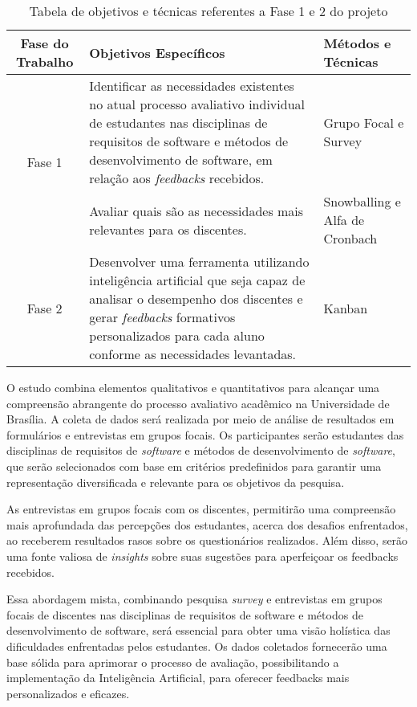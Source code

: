 \begin{table}[!ht]
    \centering
    \begin{tabularx}{\textwidth}{|c|X|X|}
    \hline
        \textbf{Fase do Trabalho} & \textbf{Objetivos Específicos} & \textbf{Métodos e Técnicas} \\ \hline
        \multirow{2}{*}{Fase 1} 
        & Identificar as necessidades existentes no atual processo avaliativo individual de estudantes nas disciplinas de requisitos de software e métodos de desenvolvimento de software, em relação aos \textit{feedbacks} recebidos. 
        & Grupo Focal e Survey \\ \cline{2-3}
        & Avaliar quais são as necessidades mais relevantes para os discentes. 
        & Snowballing e Alfa de Cronbach \\ \hline
        Fase 2 
        & Desenvolver uma ferramenta utilizando inteligência artificial que seja capaz de analisar o desempenho dos discentes e gerar \textit{feedbacks} formativos personalizados para cada aluno conforme as necessidades levantadas. 
        & Kanban \\ \hline
    \end{tabularx}
    \caption{Tabela de objetivos e técnicas referentes a Fase 1 e 2 do projeto}
\end{table}

O estudo combina elementos qualitativos e quantitativos para alcançar uma compreensão abrangente do processo avaliativo acadêmico na Universidade de Brasília. A coleta de dados será realizada por meio de análise de resultados em formulários e entrevistas em grupos focais. Os participantes serão estudantes das disciplinas de requisitos de \textit{software} e métodos de desenvolvimento de \textit{software}, que serão selecionados com base em critérios predefinidos para garantir uma representação diversificada e relevante para os objetivos da pesquisa.

As entrevistas em grupos focais com os discentes, permitirão uma compreensão mais aprofundada das percepções dos estudantes, acerca dos desafios enfrentados, ao receberem resultados rasos sobre os questionários realizados. Além disso, serão uma fonte valiosa de \textit{insights} sobre suas sugestões para aperfeiçoar os feedbacks recebidos.

Essa abordagem mista, combinando pesquisa \textit{survey} e entrevistas em grupos focais de discentes nas disciplinas de requisitos de software e métodos de desenvolvimento de software, será essencial para obter uma visão holística das dificuldades enfrentadas pelos estudantes. Os dados coletados fornecerão uma base sólida para aprimorar o processo de avaliação, possibilitando a implementação da Inteligência Artificial, para oferecer feedbacks mais personalizados e eficazes.

